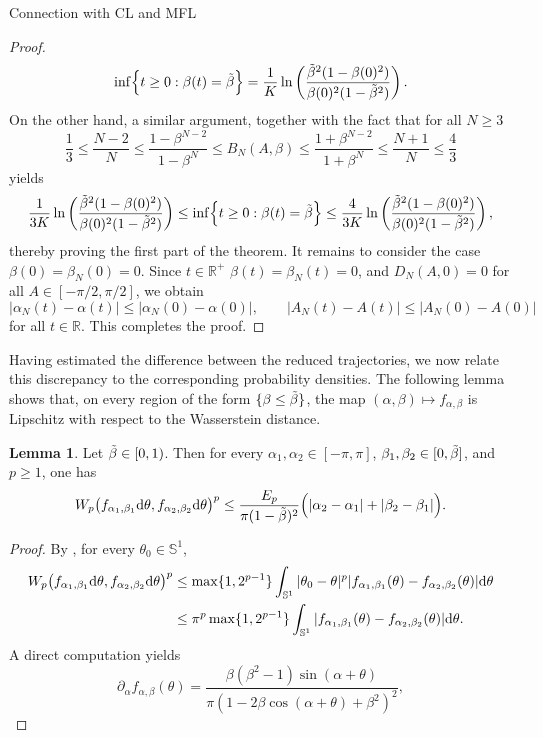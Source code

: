 \documentclass{article}
\theoremstyle{definition}
\newtheorem{lemma}[definition]{Lemma}
\renewcommand{\inf}{\mathop{\mathrm{inf}\vphantom{\mathrm{sup}}}}
\newcommand{\R}{\mathbb{R}}
\renewcommand{\d}{\textnormal{d}}
\begin{document}
\begin{section}{Connection with CL and MFL}
\begin{proof}
            $$\inf\Bigl\{ t\geq0:\beta(t)=\Tilde{\beta} \Bigr\}=\frac1K \ln\left( \frac{\Tilde{\beta}^2(1-\beta(0)^2)} {\beta(0)^2(1-\Tilde{\beta}^2)} \right).$$
            On the other hand, a similar argument, together with the fact that for all $N\geq 3$
            $$\frac{1}{3}\leq\frac{N-2}{N}\leq\frac{1-\beta^{N-2}}{1-\beta^N}\leq B_N(A,\beta)\leq\frac{1+\beta^{N-2}}{1+\beta^N}\leq\frac{N+1}{N}\leq\frac{4}{3}$$
            yields
            $$\frac{1}{3K} \ln\left( \frac{\Tilde{\beta}^2(1-\beta(0)^2)} {\beta(0)^2(1-\Tilde{\beta}^2)} \right)\leq\inf\Bigl\{ t\geq0:\beta(t)=\Tilde{\beta} \Bigr\}\leq\frac{4}{3K} \ln\left( \frac{\Tilde{\beta}^2(1-\beta(0)^2)} {\beta(0)^2(1-\Tilde{\beta}^2)} \right),$$
            thereby proving the first part of the theorem. It remains to consider the case $\beta(0)=\beta_N(0)=0$. Since $t\in\R^+$ $\beta(t)=\beta_N(t)=0$, and $D_N(A,0)=0$ for all $A\in[-\pi/2,\pi/2]$, we obtain
            $$|\alpha_N(t)-\alpha(t)|\leq|\alpha_N(0)-\alpha(0)|,\qquad|A_N(t)-A(t)|\leq|A_N(0)-A(0)|$$
            for all $t\in\R$. This completes the proof.
            \end{proof}
Having estimated the difference between the reduced trajectories, we now relate this discrepancy to the corresponding probability densities. The following lemma shows that, on every region of the form $\{\beta\leq\Tilde{\beta}\}$, the map $(\alpha,\beta)\mapsto f_{\alpha,\beta}$ is Lipschitz with respect to the Wasserstein distance.    
\begin{lemma}\label{lips_wrt_wass}
Let $\Tilde{\beta}\in[0,1)$. Then for every $\alpha_1,\alpha_2\in[-\pi,\pi]$, $\beta_1,\beta_2\in[0,\Tilde{\beta}]$, and $p\geq1$, one has
$$ W_p\big(f_{\alpha_1,\beta_1}\d\theta, f_{\alpha_2,\beta_2}\d\theta\big)^p \leq \frac{E_p}{\pi(1-\Tilde{\beta})^2} \Big( |\alpha_2-\alpha_1| + |\beta_2-\beta_1| \Big). $$
\end{lemma}
\begin{proof}
By \cite[Proposition 7.10]{villani2021topics}, for every $\theta_0\in\mathbb{S}^1$,
\begin{align*} W_p\big(f_{\alpha_1,\beta_1}\d\theta, f_{\alpha_2,\beta_2}\d\theta\big)^p &\leq \max\{1,2^{p-1}\} \int_{\mathbb{S}^1} |\theta_0-\theta|^p |f_{\alpha_1,\beta_1}(\theta)-f_{\alpha_2,\beta_2}(\theta)| \d\theta \\
&\leq \pi^p\max\{1,2^{p-1}\} \int_{\mathbb{S}^1} |f_{\alpha_1,\beta_1}(\theta)-f_{\alpha_2,\beta_2}(\theta)| \d\theta .
\end{align*}
A direct computation yields
$$ \partial_\alpha f_{\alpha,\beta}(\theta) = \frac{\beta(\beta^2-1)\sin(\alpha+\theta)} {\pi(1-2\beta\cos(\alpha+\theta)+\beta^2)^2}, $$

\end{proof}
\end{section}
\end{document}
